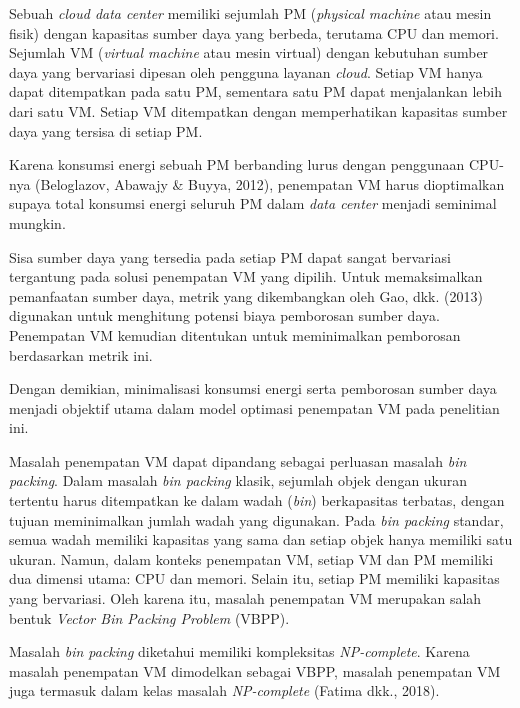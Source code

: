 Sebuah \textit{cloud data center} memiliki sejumlah PM (\textit{physical machine} atau mesin fisik) dengan kapasitas sumber daya yang berbeda, terutama CPU dan memori. Sejumlah VM (\textit{virtual machine} atau mesin virtual) dengan kebutuhan sumber daya yang bervariasi dipesan oleh pengguna layanan \textit{cloud}. Setiap VM hanya dapat ditempatkan pada satu PM, sementara satu PM dapat menjalankan lebih dari satu VM. Setiap VM ditempatkan dengan memperhatikan kapasitas sumber daya yang tersisa di setiap PM. 

Karena konsumsi energi sebuah PM berbanding lurus dengan penggunaan CPU-nya (Beloglazov, Abawajy & Buyya, 2012), penempatan VM harus dioptimalkan supaya total konsumsi energi seluruh PM dalam \textit{data center} menjadi seminimal mungkin.

Sisa sumber daya yang tersedia pada setiap PM dapat sangat bervariasi tergantung pada solusi penempatan VM yang dipilih. Untuk memaksimalkan pemanfaatan sumber daya, metrik yang dikembangkan oleh Gao, dkk. (2013)  digunakan untuk menghitung potensi biaya pemborosan sumber daya. Penempatan VM kemudian ditentukan untuk meminimalkan pemborosan berdasarkan metrik ini. 

Dengan demikian, minimalisasi konsumsi energi serta pemborosan sumber daya menjadi objektif utama dalam model optimasi penempatan VM pada penelitian ini.

Masalah penempatan VM dapat dipandang sebagai perluasan masalah \textit{bin packing}. Dalam masalah \textit{bin packing} klasik, sejumlah objek dengan ukuran tertentu harus ditempatkan ke dalam wadah (\textit{bin}) berkapasitas terbatas, dengan tujuan meminimalkan jumlah wadah yang digunakan. Pada \textit{bin packing} standar, semua wadah memiliki kapasitas yang sama dan setiap objek hanya memiliki satu ukuran. Namun, dalam konteks penempatan VM, setiap VM dan PM memiliki dua dimensi utama: CPU dan memori. Selain itu, setiap PM memiliki kapasitas yang bervariasi. Oleh karena itu, masalah penempatan VM merupakan salah bentuk \textit{Vector Bin Packing Problem} (VBPP). 

Masalah \textit{bin packing} diketahui memiliki kompleksitas \textit{NP-complete}. Karena masalah penempatan VM dimodelkan sebagai VBPP, masalah penempatan VM juga termasuk dalam kelas masalah \textit{NP-complete} (Fatima dkk., 2018). 
